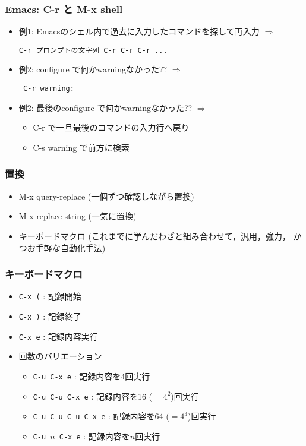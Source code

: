 \documentclass[12pt,dvipdfmx]{beamer}
\newcommand{\ao}[1]{{\color{blue}#1}}
\newcommand{\aka}[1]{{\color{red}#1}}
\begin{document}
\begin{frame}[fragile]
\frametitle{Emacs: C-r と M-x shell}
\begin{itemize}
\item 例1: Emacsのシェル内で過去に入力したコマンドを探して再入力
  $\Rightarrow$
\begin{lstlisting}
C-r プロンプトの文字列 C-r C-r C-r ...
\end{lstlisting} %
\item 例2: configure で何かwarningなかった?? $\Rightarrow$
\begin{lstlisting}
 C-r warning:
\end{lstlisting}
\item 例2: \aka{最後の}configure で何かwarningなかった?? $\Rightarrow$
  \begin{itemize}
  \item C-r で一旦最後のコマンドの入力行へ戻り
  \item C-s warning で前方に検索
  \end{itemize}
\end{itemize} %
\end{frame}


\begin{frame}[fragile]
\frametitle{置換}
\begin{itemize}
\item M-x query-replace (一個ずつ確認しながら置換)
\item M-x replace-string (一気に置換)
\item キーボードマクロ (これまでに学んだわざと組み合わせて，汎用，強力，
  かつお手軽な自動化手法)
\end{itemize}
\end{frame}


\begin{frame}
\frametitle{キーボードマクロ}
\begin{itemize}
\item \ao{\texttt{C-x (}} : 記録開始
\item \ao{\texttt{C-x )}} : 記録終了
\item \ao{\texttt{C-x e}} : 記録内容実行
\item 回数のバリエーション
  \begin{itemize}
  \item \texttt{C-u C-x e} : 記録内容を4回実行
  \item \texttt{C-u C-u C-x e} : 記録内容を16 ($= 4^2$)回実行
  \item \texttt{C-u C-u C-u C-x e} : 記録内容を64 ($= 4^3$)回実行
  \item \texttt{C-u $n$ C-x e} : 記録内容を$n$回実行
  \end{itemize}
\end{itemize}
\end{frame}
\end{document}
